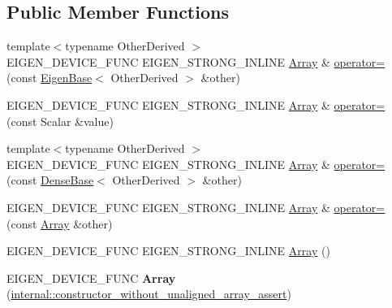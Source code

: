 \subsection*{Public Member Functions}
\begin{DoxyCompactItemize}
\item 
{\footnotesize template$<$typename Other\+Derived $>$ }\\E\+I\+G\+E\+N\+\_\+\+D\+E\+V\+I\+C\+E\+\_\+\+F\+U\+NC E\+I\+G\+E\+N\+\_\+\+S\+T\+R\+O\+N\+G\+\_\+\+I\+N\+L\+I\+NE \mbox{\hyperlink{class_eigen_1_1_array}{Array}} \& \mbox{\hyperlink{class_eigen_1_1_array_aed9cf975768953131c28096c84952a08}{operator=}} (const \mbox{\hyperlink{struct_eigen_1_1_eigen_base}{Eigen\+Base}}$<$ Other\+Derived $>$ \&other)
\item 
E\+I\+G\+E\+N\+\_\+\+D\+E\+V\+I\+C\+E\+\_\+\+F\+U\+NC E\+I\+G\+E\+N\+\_\+\+S\+T\+R\+O\+N\+G\+\_\+\+I\+N\+L\+I\+NE \mbox{\hyperlink{class_eigen_1_1_array}{Array}} \& \mbox{\hyperlink{class_eigen_1_1_array_ab77cffb759a431d4a55ed150e850805a}{operator=}} (const Scalar \&value)
\item 
{\footnotesize template$<$typename Other\+Derived $>$ }\\E\+I\+G\+E\+N\+\_\+\+D\+E\+V\+I\+C\+E\+\_\+\+F\+U\+NC E\+I\+G\+E\+N\+\_\+\+S\+T\+R\+O\+N\+G\+\_\+\+I\+N\+L\+I\+NE \mbox{\hyperlink{class_eigen_1_1_array}{Array}} \& \mbox{\hyperlink{class_eigen_1_1_array_a8415de9a2e74e018c98d6e6271b307a5}{operator=}} (const \mbox{\hyperlink{class_eigen_1_1_dense_base}{Dense\+Base}}$<$ Other\+Derived $>$ \&other)
\item 
E\+I\+G\+E\+N\+\_\+\+D\+E\+V\+I\+C\+E\+\_\+\+F\+U\+NC E\+I\+G\+E\+N\+\_\+\+S\+T\+R\+O\+N\+G\+\_\+\+I\+N\+L\+I\+NE \mbox{\hyperlink{class_eigen_1_1_array}{Array}} \& \mbox{\hyperlink{class_eigen_1_1_array_a56cb38f362f88a6239f802ea226fee6a}{operator=}} (const \mbox{\hyperlink{class_eigen_1_1_array}{Array}} \&other)
\item 
E\+I\+G\+E\+N\+\_\+\+D\+E\+V\+I\+C\+E\+\_\+\+F\+U\+NC E\+I\+G\+E\+N\+\_\+\+S\+T\+R\+O\+N\+G\+\_\+\+I\+N\+L\+I\+NE \mbox{\hyperlink{class_eigen_1_1_array_a715524a79accfdc70dbc8cab1d7086ae}{Array}} ()
\item 
\mbox{\label{class_eigen_1_1_array_abcac99438e63d02a939727997e32b4ec}} 
E\+I\+G\+E\+N\+\_\+\+D\+E\+V\+I\+C\+E\+\_\+\+F\+U\+NC {\bfseries Array} (\mbox{\hyperlink{struct_eigen_1_1internal_1_1constructor__without__unaligned__array__assert}{internal\+::constructor\+\_\+without\+\_\+unaligned\+\_\+array\+\_\+assert}})

\end{DoxyCompactItemize}
